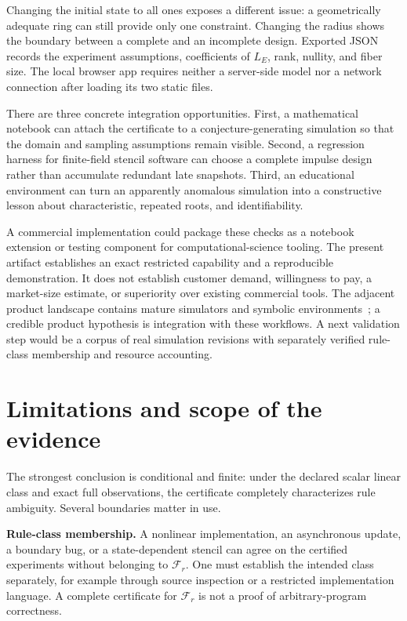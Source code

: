 \documentclass[11pt]{article}
\begin{document}
Changing the initial state to all ones exposes a different issue: a geometrically adequate ring can still provide only one constraint. Changing the radius shows the boundary between a complete and an incomplete design. Exported JSON records the experiment assumptions, coefficients of $L_E$, rank, nullity, and fiber size. The local browser app requires neither a server-side model nor a network connection after loading its two static files.

There are three concrete integration opportunities. First, a mathematical notebook can attach the certificate to a conjecture-generating simulation so that the domain and sampling assumptions remain visible. Second, a regression harness for finite-field stencil software can choose a complete impulse design rather than accumulate redundant late snapshots. Third, an educational environment can turn an apparently anomalous simulation into a constructive lesson about characteristic, repeated roots, and identifiability.

A commercial implementation could package these checks as a notebook extension or testing component for computational-science tooling. The present artifact establishes an exact restricted capability and a reproducible demonstration. It does not establish customer demand, willingness to pay, a market-size estimate, or superiority over existing commercial tools. The adjacent product landscape contains mature simulators and symbolic environments~\cite{golly,sage,wolfram}; a credible product hypothesis is integration with these workflows. A next validation step would be a corpus of real simulation revisions with separately verified rule-class membership and resource accounting.

\section{Limitations and scope of the evidence}
The strongest conclusion is conditional and finite: under the declared scalar linear class and exact full observations, the certificate completely characterizes rule ambiguity. Several boundaries matter in use.

\textbf{Rule-class membership.} A nonlinear implementation, an asynchronous update, a boundary bug, or a state-dependent stencil can agree on the certified experiments without belonging to $\mathcal F_r$. One must establish the intended class separately, for example through source inspection or a restricted implementation language. A complete certificate for $\mathcal F_r$ is not a proof of arbitrary-program correctness.
\end{document}
